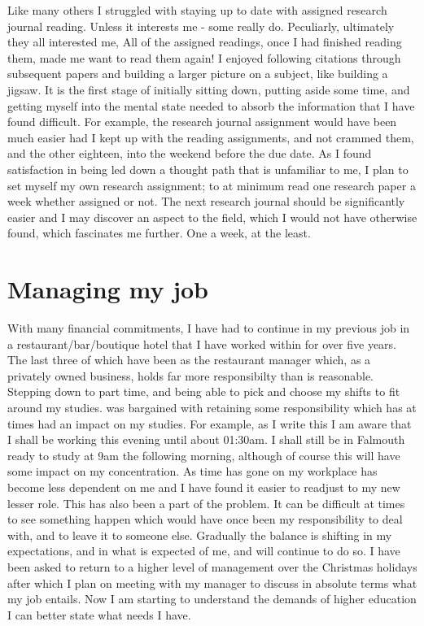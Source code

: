 \documentclass{scrartcl}
\begin{document}
Like many others I struggled with staying up to date with assigned research journal reading. Unless it interests me - some really do. Peculiarly, ultimately they all interested me, All of the assigned readings, once I had finished reading them, made me want to read them again! I enjoyed following citations through subsequent papers and building a larger picture on a subject, like building a jigsaw. It is the first stage of initially sitting down, putting aside some time, and getting myself into the mental state needed to absorb the information that I have found difficult. For example, the research journal assignment would have been much easier had I kept up with the reading assignments, and not crammed them, and the other eighteen, into the weekend before the due date. As I found satisfaction in being led down a thought path that is unfamiliar to me, I plan to set myself my own research assignment; to at minimum read one research paper a week whether assigned or not. The next research journal should be significantly easier and I may discover an aspect to the field, which I would not have otherwise found, which fascinates me further. One a week, at the least.

\section{Managing my job}

With many financial commitments, I have had to continue in my previous job in a restaurant/bar/boutique hotel that I have worked within for over five years. The last three of which have been as the restaurant manager which, as a privately owned business, holds far more responsibilty than is reasonable. Stepping down to part time, and being able to pick and choose my shifts to fit around my studies. was bargained with retaining some responsibility which has at times had an impact on my studies. For example, as I write this I am aware that I shall be working this evening until about 01:30am. I shall still be in Falmouth ready to study at 9am the following morning, although of course this will have some impact on my concentration. As time has gone on my workplace has become less dependent on me and I have found it easier to readjust to my new lesser role. This has also been a part of the problem. It can be difficult at times to see something happen which would have once been my responsibility to deal with, and to leave it to someone else. Gradually the balance is shifting in my expectations, and in what is expected of me, and will continue to do so. I have been asked to return to a higher level of management over the Christmas holidays after which I plan on meeting with my manager to discuss in absolute terms what my job entails. Now I am starting to understand the demands of higher education I can better state what needs I have.
\end{document}
